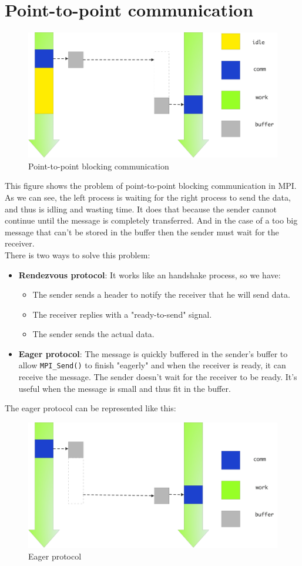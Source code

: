 \documentclass[12pt, openany]{report}
\theoremstyle{definition}
\newcommand{\code}[1]{\colorbox{light-gray}{\texttt{#1}}}
\begin{document}
\section{Point-to-point communication}
\begin{figure}[H]
	\centering
	\includegraphics[width=0.8\linewidth]{img/com2.png}
	\caption{Point-to-point blocking communication}
	\label{fig:Com_block}
\end{figure}
This figure shows the problem of point-to-point blocking communication in MPI. As we can see, the left process is waiting for the right process to send the data, and thus is idling and wasting time. It does that because the sender cannot continue until the message is completely transferred. And in the case of a too big message that can't be stored in the buffer then the sender must wait for the receiver.\\
There is two ways to solve this problem:
\begin{itemize}
	\item \textbf{Rendezvous protocol}: It works like an handshake process, so we have:
	\begin{itemize}
		\item The sender sends a header to notify the receiver that he will send data.
		\item The receiver replies with a "ready-to-send" signal.
		\item The sender sends the actual data.
	\end{itemize}
	\item \textbf{Eager protocol}: The message is quickly buffered in the sender's buffer to allow \code{MPI\_Send()} to finish "eagerly" and when the receiver is ready, it can receive the message. The sender doesn't wait for the receiver to be ready. It's useful when the message is small and thus fit in the buffer.\\
\end{itemize}
The eager protocol can be represented like this:
\begin{figure}[H]
	\centering
	\includegraphics[width=0.8\linewidth]{img/eager.jpeg}
	\caption{Eager protocol}
	\label{fig:eager}
\end{figure}
\end{document}
